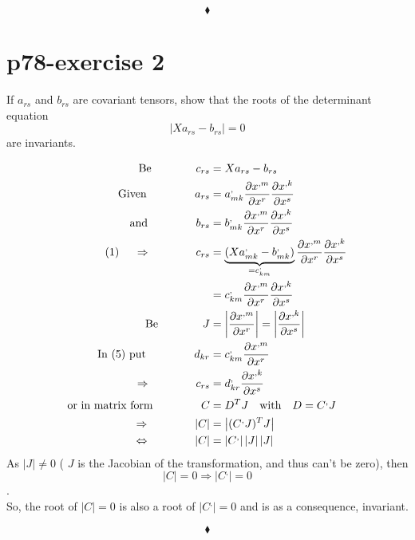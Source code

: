 $$\blacklozenge$$
\newpage

\section{p78-exercise 2}
\begin{tcolorbox}
If $a_{rs}$ and $b_{rs}$ are covariant tensors, show that the roots of the determinant equation $$\left|Xa_{rs} - b_{rs}\right |= 0$$ are invariants.
\end{tcolorbox}
\begin{align}
\text{Be}\quad\quad\quad\quad c_{rs} &= Xa_{rs} - b_{rs}\\
\text{Given }\quad\quad\quad\quad a_{rs} &= a^{,}_{mk}\pdv{x^{,m}}{x^r} \pdv{x^{,k}}{x^s}\\
\text{and }\quad\quad\quad\quad b_{rs} &= b^{,}_{mk}\pdv{x^{,m}}{x^r} \pdv{x^{,k}}{x^s}\\
\text{(1) }\quad\Rightarrow\quad\quad\quad\quad c_{rs} &= \underbrace{(Xa^{,}_{mk}-b^{,}_{mk})}_{=c^{,}_{km}} \pdv{x^{,m}}{x^r} \pdv{x^{,k}}{x^s}\\
\ &= c^{,}_{km} \pdv{x^{,m}}{x^r} \pdv{x^{,k}}{x^s}\\
\text{Be}\quad\quad\quad\quad J &= \left |\pdv{x^{,m}}{x^r}\right |= \left |\pdv{x^{,k}}{x^s}\right |\\
\text{In (5) put  }\quad\quad\quad\quad d_{kr} &= c^{,}_{km} \pdv{x^{,m}}{x^r} \\
\Rightarrow\quad\quad\quad\quad c_{rs} &= d^{,}_{kr} \pdv{x^{,k}}{x^s}\\
\text{or in matrix form  } \quad\quad\quad\quad C &= D^T J\quad \text{with}\quad D = C^{,}J\\
\Rightarrow\quad\quad\quad\quad \left |C \right| &= \left | (C^{,}J)^T J\right |\\
\Leftrightarrow\quad\quad\quad\quad \left |C \right| &= \left | C^{,}\right | \left |J\right |\left |J\right |
\end{align}
As $ \left |J\right | \ne 0$ ( $J$ is the Jacobian of the transformation, and thus can't be zero), then $$\left |C \right| = 0 \Rightarrow \left |C^{,} \right| = 0$$.\\
So, the root of $\left |C \right| = 0 $ is also a root of $\left |C^{,} \right| = 0$ and is as a consequence, invariant.

$$\blacklozenge$$
\newpage

